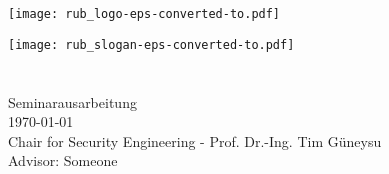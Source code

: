 
\frontmatter

\begin{titlepage}
    \enlargethispage{3cm}
    \vspace*{-32mm}\hspace*{120mm}
    \texttt{[image: rub\_logo-eps-converted-to.pdf]}
    
    \vspace*{11cm}\hspace*{0mm}
    \begin{minipage}[b]{1\linewidth}
        \sffamily
        \hspace{-17.2mm}\texttt{[image: rub\_slogan-eps-converted-to.pdf]}\\
        
        \nohyphens{
            {\bfseries \LARGE \sffamily {\thtitle}}
        }\\
        
        \large{
            \thauthor
        }\\
        
        \vspace*{35mm}
        \normalsize{
            Seminarausarbeitung\\
            \today\\
            Chair for Security Engineering - Prof. Dr.-Ing. Tim G{\"u}neysu\\
            Advisor: Someone
        }
    \end{minipage}
\end{titlepage}

\newpage\thispagestyle{empty}
